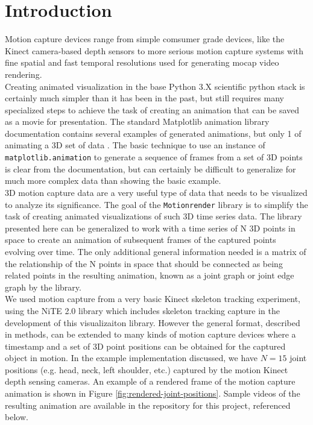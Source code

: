 \documentclass[10pt,a4paper]{article}
\begin{document}
\section*{Introduction}

Motion capture devices range from simple comsumer grade devices, like
the Kinect camera-based depth sensors \cite{pfister-2014, napoli-2017}
to more serious motion capture systems \cite{bregler-2007,menolotto-2020}
with fine spatial and fast temporal resolutions used
for generating mocap video rendering.
\\

Creating animated visualization in the base Python 3.X scientific
python stack is certainly much simpler than it has been in the past,
but still requires many specialized steps to achieve the task of
creating an animation that can be saved as a movie for presentation.
The standard Matplotlib animation library documentation
\cite{matplotlib-animation-2022} contains several examples of
generated animations, but only 1 of animating a 3D set of data
\cite{matplotlib-3d-random-walk-2022}.  The basic technique to use an
instance of \verb|matplotlib.animation| to generate a sequence of frames
from a set of 3D points is clear from the documentation, but can
certainly be difficult to generalize for much more complex data than
showing the basic example.
\\

3D motion capture data are a very useful type of data that needs to be
visualized to analyze its significance.  The goal of the
\verb|Motionrender| library is to simplify the task of creating
animated visualizations of such 3D time series data.  The library
presented here can be generalized to work with a time series of N 3D
points in space to create an animation of subsequent frames of the
captured points evolving over time.  The only additional general
information needed is a matrix of the relationship of the N points in
space that should be connected as being related points in the
resulting animation, known as a joint graph or joint edge graph
by the library.
\\

We used motion capture from a very basic Kinect skeleton tracking
experiment, using the NiTE 2.0 library \cite{nite-2.0-2022,
  nuitrack-2022} which includes skeleton tracking capture in the
development of this visualizaiton library.  However the general
format, described in methods, can be extended to many kinds of motion
capture devices where a timestamp and a set of 3D point positions can
be obtained for the captured object in motion.  In the example
implementation discussed, we have $N = 15$ joint positions (e.g. head,
neck, left shoulder, etc.) captured by the motion Kinect depth sensing
cameras.  An example of a rendered frame of the motion capture
animation is shown in Figure \ref{fig:rendered-joint-positions}.
Sample videos of the resulting animation are available in the
repository for this project, referenced below.
\\
\end{document}
